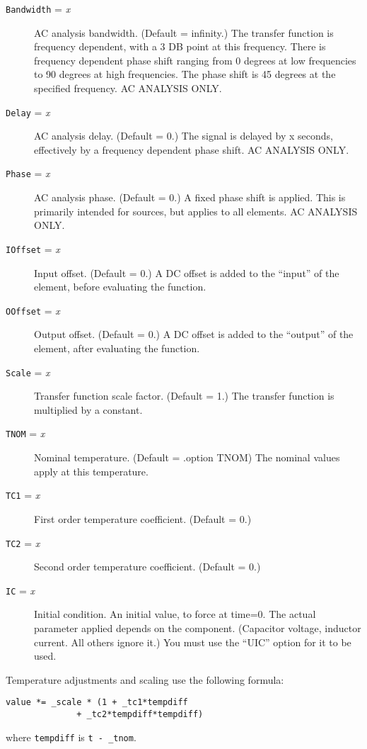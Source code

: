 \begin{description}

\item[{\tt Bandwidth} = {\it x}] AC analysis bandwidth.
(Default = infinity.)  The transfer function is frequency dependent,
with a 3 DB point at this frequency.  There is frequency dependent
phase shift ranging from 0 degrees at low frequencies to 90 degrees at
high frequencies.  The phase shift is 45 degrees at the specified
frequency.  AC ANALYSIS ONLY.

\item[{\tt Delay} = {\it x}] AC analysis delay.  (Default = 0.) 
The signal is delayed by x seconds, effectively by a frequency
dependent phase shift.  AC ANALYSIS ONLY.

\item[{\tt Phase} = {\it x}] AC analysis phase.  (Default = 0.)
A fixed phase shift is applied.  This is primarily intended for
sources, but applies to all elements.  AC ANALYSIS ONLY.

\item[{\tt IOffset} = {\it x}] Input offset.  (Default = 0.)
A DC offset is added to the ``input'' of the element, before
evaluating the function.

\item[{\tt OOffset} = {\it x}] Output offset.  (Default = 0.)
A DC offset is added to the ``output'' of the element, after
evaluating the function.

\item[{\tt Scale} = {\it x}] Transfer function scale factor.  
(Default = 1.)  The transfer function is multiplied by a constant.

\item[{\tt TNOM} = {\it x}] Nominal temperature.  (Default = .option TNOM)
The nominal values apply at this temperature.

\item[{\tt TC1} = {\it x}] First order temperature coefficient.
(Default = 0.) 

\item[{\tt TC2} = {\it x}] Second order temperature coefficient.
(Default = 0.) 

\item[{\tt IC} = {\it x}] Initial condition.  An initial value, to
force at time=0.  The actual parameter applied depends on the
component.  (Capacitor voltage, inductor current.  All others ignore
it.)  You must use the ``UIC'' option for it to be used.

\end{description}

Temperature adjustments and scaling use the following formula:
\begin{verbatim}
value *= _scale * (1 + _tc1*tempdiff 
              + _tc2*tempdiff*tempdiff)
\end{verbatim}
where {\tt tempdiff} is {\tt t - \_tnom}.

